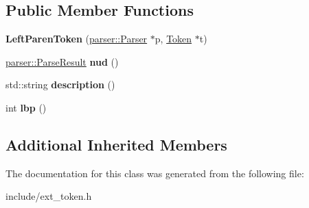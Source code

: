 \subsection*{Public Member Functions}
\begin{DoxyCompactItemize}
\item 
{\bfseries Left\+Paren\+Token} (\hyperlink{classfcal_1_1parser_1_1Parser}{parser\+::\+Parser} $\ast$p, \hyperlink{classfcal_1_1scanner_1_1Token}{Token} $\ast$t)\hypertarget{classfcal_1_1scanner_1_1LeftParenToken_a306e81a052bdff9c4e9fb4912e0732ee}{}\label{classfcal_1_1scanner_1_1LeftParenToken_a306e81a052bdff9c4e9fb4912e0732ee}

\item 
\hyperlink{classfcal_1_1parser_1_1ParseResult}{parser\+::\+Parse\+Result} {\bfseries nud} ()\hypertarget{classfcal_1_1scanner_1_1LeftParenToken_a793eb1dfcd6ea5546081c7cf8733534a}{}\label{classfcal_1_1scanner_1_1LeftParenToken_a793eb1dfcd6ea5546081c7cf8733534a}

\item 
std\+::string {\bfseries description} ()\hypertarget{classfcal_1_1scanner_1_1LeftParenToken_a32ea8cf7b793bb532161781f8f42113c}{}\label{classfcal_1_1scanner_1_1LeftParenToken_a32ea8cf7b793bb532161781f8f42113c}

\item 
int {\bfseries lbp} ()\hypertarget{classfcal_1_1scanner_1_1LeftParenToken_a2bfc3c31dc0fef8961d4f33a3bc81f25}{}\label{classfcal_1_1scanner_1_1LeftParenToken_a2bfc3c31dc0fef8961d4f33a3bc81f25}

\end{DoxyCompactItemize}
\subsection*{Additional Inherited Members}


The documentation for this class was generated from the following file\+:\begin{DoxyCompactItemize}
\item 
include/ext\+\_\+token.\+h\end{DoxyCompactItemize}
